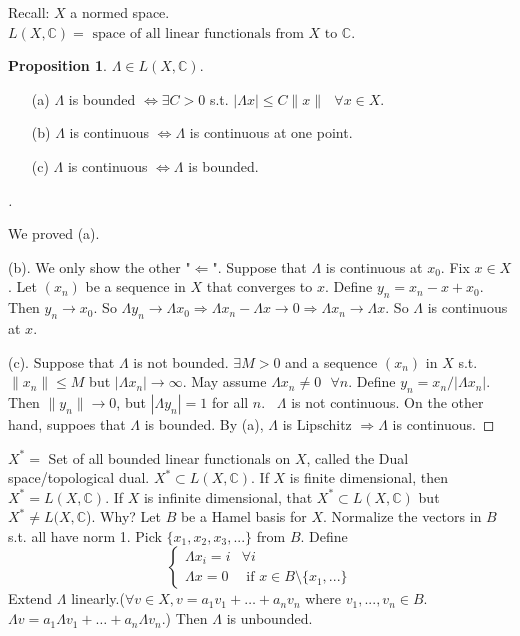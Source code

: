 \documentclass{article}
\theoremstyle{definition}
\newtheorem{prop}{Proposition}
\newenvironment{proofs}[1][\proofname]{%
  \begin{proof}[#1]$ $\par\nobreak\ignorespaces
}{%
  \end{proof}
}
\newcommand{\sfa}{\text{  } \forall}
\begin{document}
\par Recall: $X$ a normed space.
$L(X, \mathbb{C}) = \text{ space of all linear functionals from } X \text{ to } \mathbb{C}$.

\begin{prop}
	$\Lambda \in L(X, \mathbb{C})$. 

	\begin{enumerate}
		\item[(a)] $\Lambda$ is bounded $\Leftrightarrow \exists C > 0$ s.t. $|\Lambda x| \leq C\| x \| \sfa x \in X$.

		\item[(b)] $\Lambda$ is continuous $\Leftrightarrow \Lambda$ is continuous at one point.

		\item[(c)] $\Lambda$ is continuous $\Leftrightarrow \Lambda$ is bounded.
	\end{enumerate}
\end{prop}

\begin{proofs}
	We proved (a). 
	\par (b). We only show the other "$\Leftarrow$". 
	Suppose that $\Lambda$ is continuous at $x_0$.
	Fix $x \in X$. 
	Let $(x_n)$ be a sequence in $X$ that converges to $x$.
	Define $y_n = x_n - x + x_0$.
	Then $y_n \to x_0$.
	So $\Lambda y_n \to \Lambda x_0 \Rightarrow \Lambda x_n - \Lambda x \to 0 \Rightarrow \Lambda x_n \to \Lambda x$.
	So $\Lambda$ is continuous at $x$.
	\par (c). Suppose that $\Lambda$ is not bounded. 
	$\exists M > 0$ and a sequence $(x_n)$ in $X$ s.t. $\|x_n\| \leq M$ but $|\Lambda x_n| \to \infty$.
	May assume $\Lambda x_n \neq 0 \sfa n$. 
	Define $y_n = x_n / |\Lambda x_n|$.
	Then $\|y_n \| \to 0$, but $| \Lambda y_n| = 1$ for all $n$. \
	$\Lambda$ is not continuous. 
	On the other hand, suppoes that $\Lambda$ is bounded. By (a), $\Lambda$ is Lipschitz $\Rightarrow \Lambda$ is continuous. 

\end{proofs}

$X^* = $ Set of all bounded linear functionals on $X$, called the Dual space/topological dual.
$X^* \subset L(X, \mathbb{C})$.
If $X$ is finite dimensional, then $X^* = L(X, \mathbb{C})$. 
If $X$ is infinite dimensional, that $X^* \subset L(X, \mathbb{C})$ but $X^* \neq L(X, \mathbb{C}$). 
Why? 
Let $B$ be a Hamel basis for $X$.
Normalize the vectors in $B$ s.t. all have norm 1.
Pick $\{x_1, x_2, x_3, ...\}$ from $B$. 
Define
\[
	\begin{cases}
		\Lambda x_i = i & \forall i\\
		\Lambda x = 0 & \text{ if } x \in B \setminus \{x_1, ...\}
	\end{cases}
\]
Extend $\Lambda$ linearly.($ \forall v \in X, v = a_1 v_1 + \hdots + a_n v_n$ where $v_1, ..., v_n \in B$. $\Lambda v = a_1 \Lambda v_1 + \hdots + a_n \Lambda v_n$.)
Then $\Lambda$ is unbounded.
\end{document}
